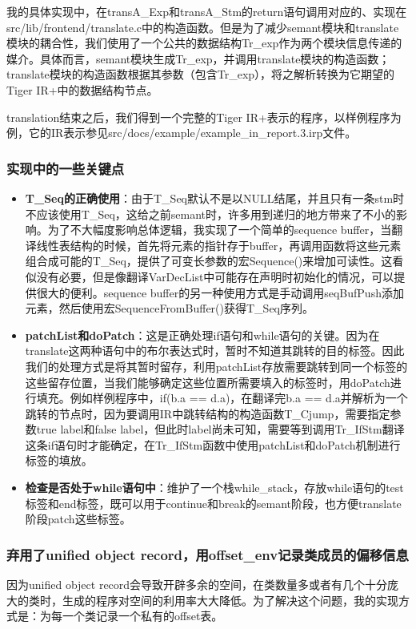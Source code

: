 \documentclass{article}
\begin{document}
我的具体实现中，在transA\_Exp和transA\_Stm的return语句调用对应的、实现在src/lib/frontend/translate.c中的构造函数。但是为了减少semant模块和translate模块的耦合性，我们使用了一个公共的数据结构Tr\_exp作为两个模块信息传递的媒介。具体而言，semant模块生成Tr\_exp，并调用translate模块的构造函数；translate模块的构造函数根据其参数（包含Tr\_exp），将之解析转换为它期望的Tiger IR+中的数据结构节点。

translation结束之后，我们得到一个完整的Tiger IR+表示的程序，以样例程序为例，它的IR表示参见src/docs/example/example\_in\_report.3.irp文件。

\subsubsection{实现中的一些关键点}
\begin{itemize}
    \item \textbf{T\_Seq的正确使用}：由于T\_Seq默认不是以NULL结尾，并且只有一条stm时不应该使用T\_Seq，这给之前semant时，许多用到递归的地方带来了不小的影响。为了不大幅度影响总体逻辑，我实现了一个简单的sequence buffer，当翻译线性表结构的时候，首先将元素的指针存于buffer，再调用函数将这些元素组合成可能的T\_Seq，提供了可变长参数的宏Sequence()来增加可读性。这看似没有必要，但是像翻译VarDecList中可能存在声明时初始化的情况，可以提供很大的便利。sequence buffer的另一种使用方式是手动调用seqBufPush添加元素，然后使用宏SequenceFromBuffer()获得T\_Seq序列。

    \item \textbf{patchList和doPatch}：这是正确处理if语句和while语句的关键。因为在translate这两种语句中的布尔表达式时，暂时不知道其跳转的目的标签。因此我们的处理方式是将其暂时留存，利用patchList存放需要跳转到同一个标签的这些留存位置，当我们能够确定这些位置所需要填入的标签时，用doPatch进行填充。例如样例程序中，if(b.a == d.a)，在翻译完b.a == d.a并解析为一个跳转的节点时，因为要调用IR中跳转结构的构造函数T\_Cjump，需要指定参数true label和false label，但此时label尚未可知，需要等到调用Tr\_IfStm翻译这条if语句时才能确定，在Tr\_IfStm函数中使用patchList和doPatch机制进行标签的填放。

    \item \textbf{检查是否处于while语句中}：维护了一个栈while\_stack，存放while语句的test标签和end标签，既可以用于continue和break的semant阶段，也方便translate阶段patch这些标签。

\end{itemize}

\subsubsection{弃用了unified object record，用offset\_env记录类成员的偏移信息}
因为unified object record会导致开辟多余的空间，在类数量多或者有几个十分庞大的类时，生成的程序对空间的利用率大大降低。为了解决这个问题，我的实现方式是：为每一个类记录一个私有的offset表。
\end{document}

